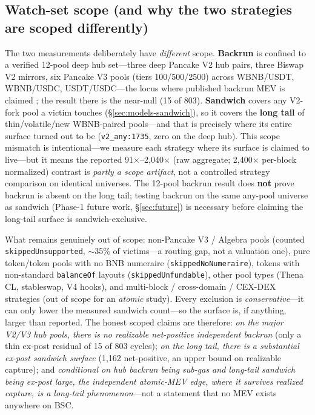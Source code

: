 \documentclass[11pt]{article}
\newcommand{\code}[1]{\texttt{#1}}
\begin{document}
\subsection{Watch-set scope (and why the two strategies are scoped differently)}
The two measurements deliberately have \emph{different} scope. \textbf{Backrun} is
confined to a verified 12-pool deep hub set---three deep Pancake V2 hub pairs, three
Biswap V2 mirrors, six Pancake V3 pools (tiers 100/500/2500) across WBNB/USDT, WBNB/USDC,
USDT/USDC---the locus where published backrun MEV is claimed \cite{wang2025binance}; the
result there is the near-null (15 of 803). \textbf{Sandwich} covers any V2-fork pool a
victim touches (\S\ref{sec:models-sandwich}), so it covers
the \textbf{long tail} of thin/volatile/new WBNB-paired pools---and that is precisely
where its entire surface turned out to be (\code{v2\_any:1735}, zero on the deep hub).
This scope mismatch is intentional---we measure each strategy where its surface is claimed
to live---but it means the reported 91$\times$--2{,}040$\times$ (raw aggregate; 2{,}400$\times$ per-block normalized) contrast is \emph{partly a
scope artifact}, not a controlled strategy comparison on identical universes. The 12-pool
backrun result does \textbf{not} prove backrun is absent on the long tail; testing backrun
on the same any-pool universe as sandwich (Phase-1 future work, \S\ref{sec:future}) is
necessary before claiming the long-tail surface is sandwich-exclusive.

What remains genuinely out of scope: non-Pancake V3 / Algebra pools (counted
\code{skippedUnsupported}, $\sim$35\% of victims---a routing gap, not a valuation one),
pure token/token pools with no BNB numeraire (\code{skippedNoNumeraire}), tokens with
non-standard \code{balanceOf} layouts (\code{skippedUnfundable}), other pool types
(Thena CL, stableswap, V4 hooks), and multi-block / cross-domain / CEX-DEX strategies
(out of scope for an \emph{atomic} study). Every exclusion is \emph{conservative}---it
can only lower the measured sandwich count---so the surface is, if anything, larger
than reported. The honest scoped claims are therefore: \emph{on the major V2/V3 hub
pools, there is no realizable net-positive independent backrun} (only a thin ex-post
residual of 15 of 803 cycles); \emph{on the long tail, there is a substantial ex-post
sandwich surface} (1{,}162 net-positive, an upper bound on realizable capture); and
\emph{conditional on hub backrun being sub-gas and long-tail sandwich being ex-post large,
the independent atomic-MEV edge, where it survives realized capture, is a long-tail
phenomenon}---not a statement that no MEV exists anywhere on BSC.
\end{document}
